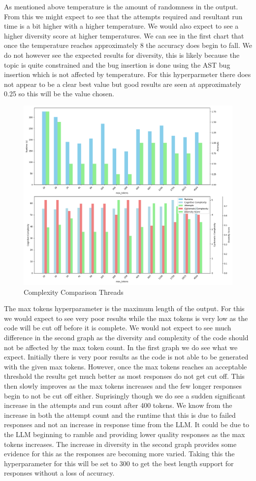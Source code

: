 \documentclass[12pt]{extarticle}
\begin{document}
As mentioned above temperature is the amount of randomness in the output. From this we might expect to see that the attempts required and resultant run time is a bit higher with a higher temperature. We would also expect to see a higher diversity score at higher temperatures. We can see in the first chart that once the temperature reaches approximately 8 the accuracy does begin to fall. We do not however see the expected results for diversity, this is likely because the topic is quite constrained and the bug insertion is done using the AST bug insertion which is not affected by temperature. For this hyperparmeter there does not appear to be a clear best value but good results are seen at approximately 0.25 so this will be the value chosen.

\begin{figure}[H]
\centering
\includegraphics[width=0.7\linewidth]{Images/Hyperparam_max_tokens_Comparison.png}
\caption{Complexity Comparison Threads}
\label{fig:Complexity_Comparison_Threads}
\end{figure}

The max tokens hyperparameter is the maximum length of the output. For this we would expect to see very poor results while the max tokens is very low as the code will be cut off before it is complete. We would not expect to see much difference in the second graph as the diversity and complexity of the code should not be affected by the max token count. In the first graph we do see what we expect. Initially there is very poor results as the code is not able to be generated with the given max tokens. However, once the max tokens reaches an acceptable threshold the results get much better as most responses do not get cut off. This then slowly improves as the max tokens increases and the few longer responses begin to not be cut off either. Suprisingly though we do see a sudden significant increase in the attempts and run count after 400 tokens. We know from the increase in both the attempt count and the runtime that this is due to failed responses and not an increase in response time from the LLM. It could be due to the LLM beginning to ramble and providing lower quality responses as the max tokens increases. The increase in diversity in the second graph provides some evidence for this as the responses are becoming more varied. Taking this the hyperparameter for this will be set to 300 to get the best length support for responses without a loss of accuracy.
\end{document}
